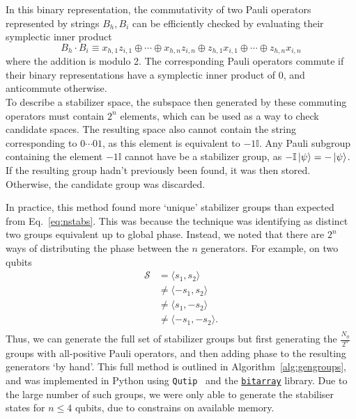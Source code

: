 \documentclass{standalone}
\begin{document}
In this binary representation, the commutativity of two Pauli operators represented by strings $B_{h},B_{i}$ can be efficiently checked by evaluating their symplectic inner product
\begin{equation}\label{eq:sympprod}
    B_{h}\cdot B_{i} \equiv x_{h,1}z_{i,1}\oplus\cdots\oplus x_{h,n}z_{i,n}\oplus z_{h,1}x_{i,1}\oplus\cdots\oplus z_{h,n}x_{i,n}
\end{equation}
where the addition is modulo 2. The corresponding Pauli operators commute if their binary representations have a symplectic inner product of $0$, and anticommute otherwise.\\
To describe a stabilizer space, the subspace then generated by these commuting operators must contain $2^{n}$ elements, which can be used as a way to check candidate spaces. The resulting space also cannot contain the string corresponding to $0\cdots01$, as this element is equivalent to $-1\mathbb{I}$. Any Pauli subgroup containing the element $-1\mathbb{I}$ cannot have be a stabilizer group, as $-\mathbb{I}\ket{\psi}=-\ket{\psi}$. \\
If the resulting group hadn't previously been found, it was then stored. Otherwise, the candidate group was discarded.
\par
In practice, this method found more `unique' stabilizer groups than expected from Eq.~\ref{eq:nstabs}. This was because the technique was identifying as distinct two groups equivalent up to global phase. Instead, we noted that there are $2^{n}$ ways of distributing the phase between the $n$ generators. For example, on two qubits
\begin{align*}
    \mathcal{S}&=\langle s_{1},s_{2}\rangle \\
    &\neq \langle -s_{1},s_{2}\rangle \\
    &\neq \langle s_{1},-s_{2}\rangle \\
    &\neq \langle -s_{1},-s_{2}\rangle. \\
\end{align*}
Thus, we can generate the full set of stabilizer groups but first generating the $\frac{N_{\phi}}{2^{n}}$ groups with all-positive Pauli operators, and then adding phase to the resulting generators `by hand'. This full method is outlined in Algorithm~\ref{alg:gengroups}, and was implemented in Python using \texttt{Qutip}~\cite{Johansson2012} and the \href{https://github.com/ilanschnell/bitarray}{\texttt{bitarray}} library. Due to the large number of such groups, we were only able to generate the stabiliser states for $n\leq 4$ qubits, due to constrains on available memory.
\end{document}
